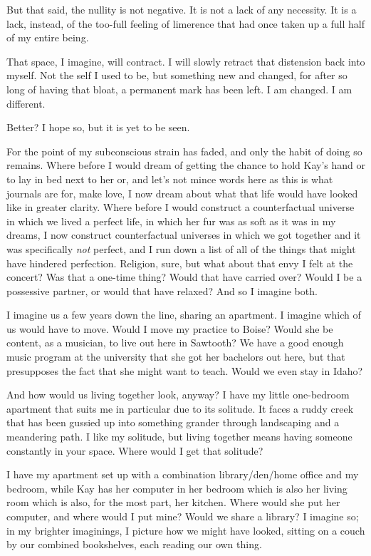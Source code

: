 But that said, the nullity is not negative. It is not a lack of any necessity. It is a lack, instead, of the too-full feeling of limerence that had once taken up a full half of my entire being.

That space, I imagine, will contract. I will slowly retract that distension back into myself. Not the self I used to be, but something new and changed, for after so long of having that bloat, a permanent mark has been left. I am changed. I am different.

Better? I hope so, but it is yet to be seen.

For the point of my subconscious strain has faded, and only the habit of doing so remains. Where before I would dream of getting the chance to hold Kay's hand or to lay in bed next to her or, and let's not mince words here as this is what journals are for, make love, I now dream about what that life would have looked like in greater clarity. Where before I would construct a counterfactual universe in which we lived a perfect life, in which her fur was as soft as it was in my dreams, I now construct counterfactual universes in which we got together and it was specifically \emph{not} perfect, and I run down a list of all of the things that might have hindered perfection. Religion, sure, but what about that envy I felt at the concert? Was that a one-time thing? Would that have carried over? Would I be a possessive partner, or would that have relaxed? And so I imagine both.

I imagine us a few years down the line, sharing an apartment. I imagine which of us would have to move. Would I move my practice to Boise? Would she be content, as a musician, to live out here in Sawtooth? We have a good enough music program at the university that she got her bachelors out here, but that presupposes the fact that she might want to teach. Would we even stay in Idaho?

And how would us living together look, anyway? I have my little one-bedroom apartment that suits me in particular due to its solitude. It faces a ruddy creek that has been gussied up into something grander through landscaping and a meandering path. I like my solitude, but living together means having someone constantly in your space. Where would I get that solitude?

I have my apartment set up with a combination library/den/home office and my bedroom, while Kay has her computer in her bedroom which is also her living room which is also, for the most part, her kitchen. Where would she put her computer, and where would I put mine? Would we share a library? I imagine so; in my brighter imaginings, I picture how we might have looked, sitting on a couch by our combined bookshelves, each reading our own thing.

